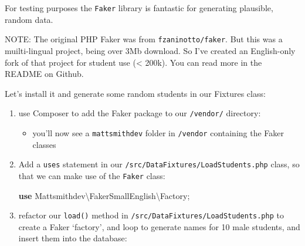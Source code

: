 \documentclass[a4paperpaper,openright]{book}
\newenvironment{Shaded}{}{}
\newcommand{\ExtensionTok}[1]{#1}
\newcommand{\KeywordTok}[1]{\textcolor[rgb]{0.00,0.44,0.13}{\textbf{#1}}}
\newcommand{\NormalTok}[1]{#1}
\newcommand{\OtherTok}[1]{\textcolor[rgb]{0.00,0.44,0.13}{#1}}
\providecommand{\tightlist}{%
  \setlength{\itemsep}{0pt}\setlength{\parskip}{0pt}}
\begin{document}
For testing purposes the \texttt{Faker} library is fantastic for
generating plausible, random data.

NOTE: The original PHP Faker was from \texttt{fzaninotto/faker}. But
this was a muilti-lingual project, being over 3Mb download. So I've
created an English-only fork of that project for student use
(\textless{} 200k). You can read more in the README on Github.

Let's install it and generate some random students in our Fixtures
class:

\begin{enumerate}
\def\labelenumi{\arabic{enumi}.}
\item
  use Composer to add the Faker package to our \texttt{/vendor/}
  directory:

\begin{Shaded}
\end{Shaded}

  \begin{itemize}
  \tightlist
  \item
    you'll now see a \texttt{mattsmithdev} folder in \texttt{/vendor}
    containing the Faker classes
  \end{itemize}
\item
  Add a \texttt{uses} statement in our
  \texttt{/src/DataFixtures/LoadStudents.php} class, so that we can make
  use of the \texttt{Faker} class:

\begin{Shaded}
\begin{Highlighting}[]
    \KeywordTok{use}\NormalTok{ Mattsmithdev\textbackslash{}FakerSmallEnglish\textbackslash{}Factory}\OtherTok{;}
\end{Highlighting}
\end{Shaded}
\item
  refactor our \texttt{load()} method in
  \texttt{/src/DataFixtures/LoadStudents.php} to create a Faker
  `factory', and loop to generate names for 10 male students, and insert
  them into the database:


\end{enumerate}
\end{document}
